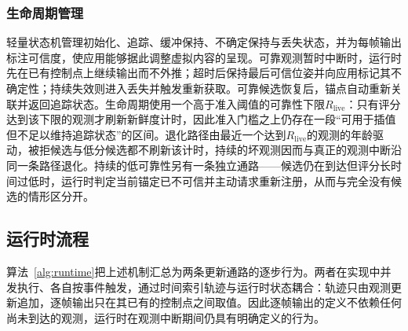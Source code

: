 \documentclass[review]{vgtc}
\begin{document}
\subsubsection{生命周期管理}\label{sec:lifecycle}

轻量状态机管理初始化、追踪、缓冲保持、不确定保持与丢失状态，并为每帧输出标注可信度，使应用能够据此调整虚拟内容的呈现。可靠观测暂时中断时，运行时先在已有控制点上继续输出而不外推；超时后保持最后可信位姿并向应用标记其不确定性；持续失效则进入丢失并触发重新获取。可靠候选恢复后，锚点自动重新关联并返回追踪状态。生命周期使用一个高于准入阈值的可靠性下限$R_{\mathrm{live}}$：只有评分达到该下限的观测才刷新新鲜度计时，因此准入门槛之上仍存在一段“可用于插值但不足以维持追踪状态”的区间。退化路径由最近一个达到$R_{\mathrm{live}}$的观测的年龄驱动，被拒候选与低分候选都不刷新该计时，持续的坏观测因而与真正的观测中断沿同一条路径退化。持续的低可靠性另有一条独立通路——候选仍在到达但评分长时间过低时，运行时判定当前锚定已不可信并主动请求重新注册，从而与完全没有候选的情形区分开。

\subsection{运行时流程}\label{sec:runtime-alg}

算法~\ref{alg:runtime}把上述机制汇总为两条更新通路的逐步行为。两者在实现中并发执行、各自按事件触发，通过时间索引轨迹与运行时状态耦合：轨迹只由观测更新追加，逐帧输出只在其已有的控制点之间取值。因此逐帧输出的定义不依赖任何尚未到达的观测，运行时在观测中断期间仍具有明确定义的行为。
\end{document}

